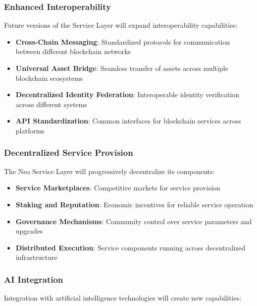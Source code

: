 \subsubsection{Enhanced Interoperability}
\label{subsubsec:enhanced-interop}

Future versions of the Service Layer will expand interoperability capabilities:

\begin{itemize}
    \item \textbf{Cross-Chain Messaging}: Standardized protocols for communication between different blockchain networks
    \item \textbf{Universal Asset Bridge}: Seamless transfer of assets across multiple blockchain ecosystems
    \item \textbf{Decentralized Identity Federation}: Interoperable identity verification across different systems
    \item \textbf{API Standardization}: Common interfaces for blockchain services across platforms
\end{itemize}

\subsubsection{Decentralized Service Provision}
\label{subsubsec:decentralized-service}

The Neo Service Layer will progressively decentralize its components:

\begin{itemize}
    \item \textbf{Service Marketplaces}: Competitive markets for service provision
    \item \textbf{Staking and Reputation}: Economic incentives for reliable service operation
    \item \textbf{Governance Mechanisms}: Community control over service parameters and upgrades
    \item \textbf{Distributed Execution}: Service components running across decentralized infrastructure
\end{itemize}

\subsubsection{AI Integration}
\label{subsubsec:ai-integration}

Integration with artificial intelligence technologies will create new capabilities:

